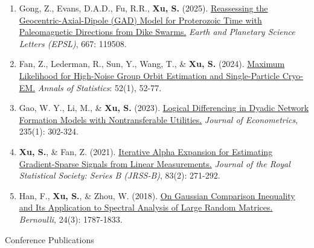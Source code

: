 \documentclass{article}
\begin{document}
\begin{enumerate}
\item Gong, Z., Evans, D.A.D., Fu, R.R., \textbf{Xu, S.} (2025). \href{https://www.sciencedirect.com/science/article/pii/S0012821X25003061?casa_token=vsDDryHMXpEAAAAA:lIHeM20Me4SpR5t_JPjA19SuDL339acc9p_Q5RUpptXcb5T5sLdaQLNYuMtuzefqHPEpawJzSxhK}{Reassessing the Geocentric-Axial-Dipole (GAD) Model for Proterozoic Time with Paleomagnetic Directions from Dike Swarms.} \emph{Earth and Planetary Science Letters (EPSL)}, 667: 119508.

\item Fan, Z., Lederman, R., Sun, Y., Wang, T., \& \textbf{Xu, S.} (2024). \href{https://projecteuclid.org/journals/annals-of-statistics/volume-52/issue-1/Maximum-likelihood-for-high-noise-group-orbit-estimation-and-single/10.1214/23-AOS2292.full}{Maximum Likelihood for High-Noise Group Orbit Estimation and Single-Particle Cryo-EM.} \emph{Annals of Statistics}: 52(1), 52-77.



\item Gao, W. Y., Li, M., \& \textbf{Xu, S.} (2023). \href{https://www.sciencedirect.com/science/article/pii/S0304407622000884}{Logical Differencing in Dyadic Network Formation Models with Nontransferable Utilities.} \emph{Journal of Econometrics}, 235(1): 302-324.

\item \textbf{Xu, S.}, \& Fan, Z. (2021). \href{https://academic.oup.com/jrsssb/article/83/2/271/7056035}{Iterative Alpha Expansion for Estimating Gradient-Sparse Signals from Linear Measurements.} \emph{Journal of the Royal Statistical Society: Series B (JRSS-B)}, 83(2): 271-292.

\item Han, F., \textbf{Xu, S.}, \& Zhou, W. (2018). \href{https://projecteuclid.org/journals/bernoulli/volume-24/issue-3/On-Gaussian-comparison-inequality-and-its-application-to-spectral-analysis/10.3150/16-BEJ912.full}{On Gaussian Comparison Inequality and Its Application to Spectral Analysis of Large Random Matrices.} \emph{Bernoulli}, 24(3): 1787-1833.
\end{enumerate}


\begin{large}
\noindent Conference Publications
\end{large}
\end{document}
